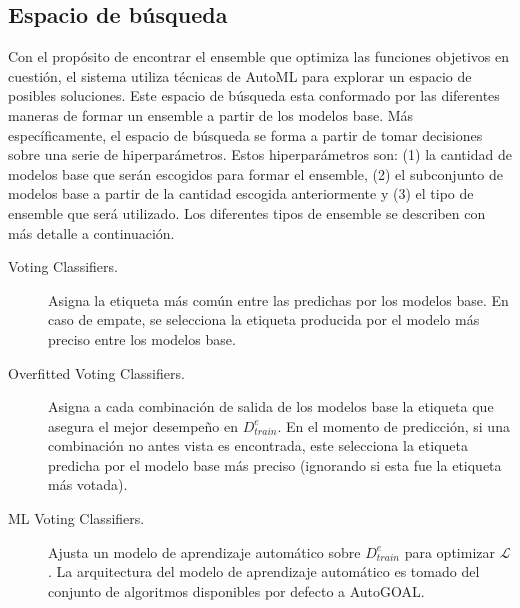 \subsection{Espacio de búsqueda}

Con el propósito de encontrar el ensemble que optimiza las funciones objetivos en cuestión, el sistema utiliza técnicas de AutoML para explorar un espacio de posibles soluciones.
Este espacio de búsqueda esta conformado por las diferentes maneras de formar un ensemble a partir de los modelos base.
Más específicamente, el espacio de búsqueda se forma a partir de tomar decisiones sobre una serie de hiperparámetros.
Estos hiperparámetros son: (1) la cantidad de modelos base que serán escogidos para formar el ensemble, (2) el subconjunto de modelos base a partir de la cantidad escogida anteriormente y (3) el tipo de ensemble que será utilizado.
Los diferentes tipos de ensemble se describen con más detalle a continuación.

\begin{description}

    \item[Voting Classifiers.]
    Asigna la etiqueta más común entre las predichas por los modelos base.
    En caso de empate, se selecciona la etiqueta producida por el modelo más preciso entre los modelos base.
    
    \item[Overfitted Voting Classifiers.]
    Asigna a cada combinación de salida de los modelos base la etiqueta que asegura el mejor desempeño en $D_{train}^e$.
    En el momento de predicción, si una combinación no antes vista es encontrada, este selecciona la etiqueta predicha por el modelo base más preciso (ignorando si esta fue la etiqueta más votada).
    
    \item[ML Voting Classifiers.]
    Ajusta un modelo de aprendizaje automático sobre $D_{train}^e$ para optimizar $\mathcal{L}$.
    La arquitectura del modelo de aprendizaje automático es tomado del conjunto de algoritmos disponibles por defecto a AutoGOAL.
    
\end{description}


